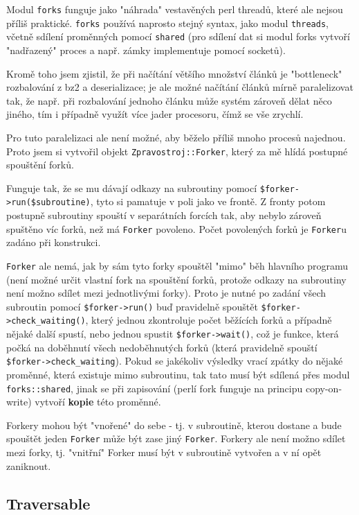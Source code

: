 \documentclass[12pt,a4paper]{report}
\begin{document}
Modul \texttt{forks} funguje jako "náhrada" vestavěných perl threadů, které ale nejsou příliš praktické. \texttt{forks} používá naprosto stejný syntax, jako modul \texttt{threads}, včetně sdílení proměnných pomocí \texttt{shared} (pro sdílení dat si modul forks vytvoří "nadřazený" proces a např. zámky implementuje pomocí socketů).

Kromě toho jsem zjistil, že při načítání většího množství článků je "bottleneck" rozbalování z bz2 a deserializace; je ale možné načítání článků mírně paralelizovat tak, že např. při rozbalování jednoho článku může systém zároveň dělat něco jiného, tím i případně využít více jader procesoru, čímž se vše zrychlí.

Pro tuto paralelizaci ale není možné, aby běželo příliš mnoho procesů najednou. Proto jsem si vytvořil objekt \texttt{Zpravostroj::Forker}, který za mě hlídá postupné spouštění forků.

Funguje tak, že se mu dávají odkazy na subroutiny pomocí \texttt{\$forker->run(\$subroutine)}, tyto si pamatuje v poli jako ve frontě. Z fronty potom postupně subroutiny spouští v separátních forcích tak, aby nebylo zároveň spuštěno víc forků, než má \texttt{Forker} povoleno. Počet povolených forků je \texttt{Forker}u zadáno při konstrukci.

\texttt{Forker} ale nemá, jak by sám tyto forky spouštěl "mimo" běh hlavního programu (není možné určit vlastní fork na spouštění forků, protože odkazy na subroutiny není možno sdílet mezi jednotlivými forky). Proto je nutné po zadání všech subroutin pomocí \texttt{\$forker->run()} buď pravidelně spouštět \texttt{\$forker->check\_waiting()}, který jednou zkontroluje počet běžících forků a případně nějaké další spustí, nebo jednou spustit \texttt{\$forker->wait()}, což je funkce, která počká na doběhnutí všech nedoběhnutých forků (která pravidelně spouští \texttt{\$forker->check\_waiting}). Pokud se jakékoliv výsledky vrací zpátky do nějaké proměnné, která existuje mimo subroutinu, tak tato musí být sdílená přes modul \texttt{forks::shared}, jinak se při zapisování (perlí fork funguje na principu copy-on-write) vytvoří \textbf{kopie} této proměnné.

Forkery mohou být "vnořené" do sebe - tj. v subroutině, kterou dostane a bude spouštět jeden \texttt{Forker} může být zase jiný \texttt{Forker}. Forkery ale není možno sdílet mezi forky, tj. "vnitřní" Forker musí být v subroutině vytvořen a v ní opět zaniknout. 

\subsection{Traversable}
\end{document}
